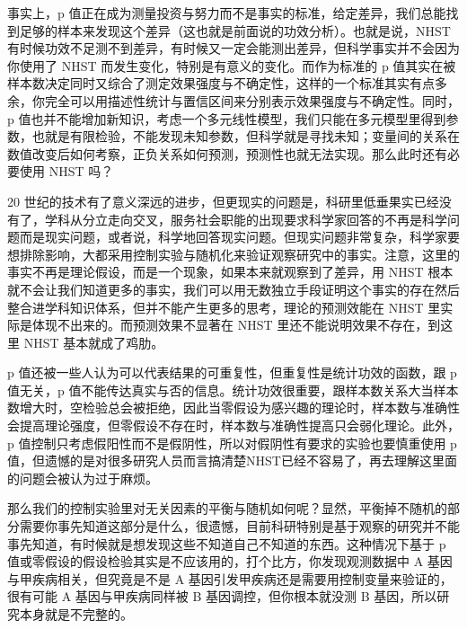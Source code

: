 \documentclass[]{tufte-book}
\begin{document}
事实上，p 值正在成为测量投资与努力而不是事实的标准，给定差异，我们总能找到足够的样本来发现这个差异（这也就是前面说的功效分析）。也就是说，NHST 有时候功效不足测不到差异，有时候又一定会能测出差异，但科学事实并不会因为你使用了 NHST 而发生变化，特别是有意义的变化。而作为标准的 p 值其实在被样本数决定同时又综合了测定效果强度与不确定性，这样的一个标准其实有点多余，你完全可以用描述性统计与置信区间来分别表示效果强度与不确定性。同时，p 值也并不能增加新知识，考虑一个多元线性模型，我们只能在多元模型里得到参数，也就是有限检验，不能发现未知参数，但科学就是寻找未知；变量间的关系在数值改变后如何考察，正负关系如何预测，预测性也就无法实现。那么此时还有必要使用 NHST 吗？

20 世纪的技术有了意义深远的进步，但更现实的问题是，科研里低垂果实已经没有了，学科从分立走向交叉，服务社会职能的出现要求科学家回答的不再是科学问题而是现实问题，或者说，科学地回答现实问题。但现实问题非常复杂，科学家要想排除影响，大都采用控制实验与随机化来验证观察研究中的事实。注意，这里的事实不再是理论假设，而是一个现象，如果本来就观察到了差异，用 NHST 根本就不会让我们知道更多的事实，我们可以用无数独立手段证明这个事实的存在然后整合进学科知识体系，但并不能产生更多的思考，理论的预测效能在 NHST 里实际是体现不出来的。而预测效果不显著在 NHST 里还不能说明效果不存在，到这里 NHST 基本就成了鸡肋。

p 值还被一些人认为可以代表结果的可重复性，但重复性是统计功效的函数，跟 p 值无关，p 值不能传达真实与否的信息。统计功效很重要，跟样本数关系大当样本数增大时，空检验总会被拒绝，因此当零假设为感兴趣的理论时，样本数与准确性会提高理论强度，但零假设不存在时，样本数与准确性提高只会弱化理论。此外，p 值控制只考虑假阳性而不是假阴性，所以对假阴性有要求的实验也要慎重使用 p 值，但遗憾的是对很多研究人员而言搞清楚NHST已经不容易了，再去理解这里面的问题会被认为过于麻烦。

那么我们的控制实验里对无关因素的平衡与随机如何呢？显然，平衡掉不随机的部分需要你事先知道这部分是什么，很遗憾，目前科研特别是基于观察的研究并不能事先知道，有时候就是想发现这些不知道自己不知道的东西。这种情况下基于 p 值或零假设的假设检验其实是不应该用的，打个比方，你发现观测数据中 A 基因与甲疾病相关，但究竟是不是 A 基因引发甲疾病还是需要用控制变量来验证的，很有可能 A 基因与甲疾病同样被 B 基因调控，但你根本就没测 B 基因，所以研究本身就是不完整的。
\end{document}
